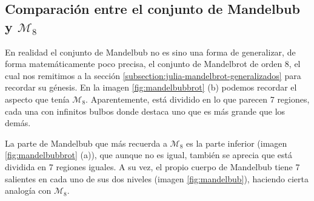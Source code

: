 \newpage

\subsection{Comparación entre el conjunto de Mandelbub y $\mathcal{M}_8$}

En realidad el conjunto de Mandelbub no es sino una forma de generalizar, de forma matemáticamente poco precisa, el conjunto de Mandelbrot de orden 8, el cual nos remitimos a la sección \ref{subsection:julia-mandelbrot-generalizados} para recordar su génesis. En la imagen \ref{fig:mandelbubbrot} (b) podemos recordar el aspecto que tenía $\mathcal{M}_8$. Aparentemente, está dividido en lo que parecen 7 regiones, cada una con infinitos bulbos donde destaca uno que es más grande que los demás. 

La parte de Mandelbub que más recuerda a $\mathcal{M}_8$ es la parte inferior (imagen \ref{fig:mandelbubbrot} (a)), que aunque no es igual, también se aprecia que está dividida en 7 regiones iguales. A su vez, el propio cuerpo de Mandelbub tiene 7 salientes en cada uno de sus dos niveles (imagen \ref{fig:mandelbub}), haciendo cierta analogía con $\mathcal{M}_8$. 

